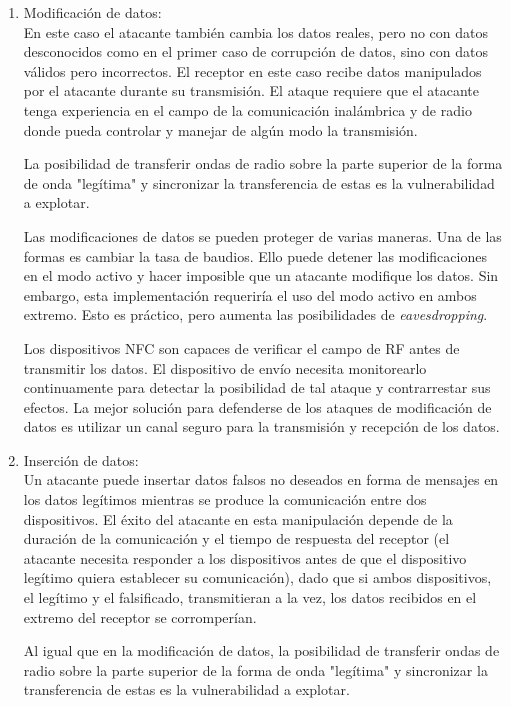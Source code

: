 \documentclass[12pt,a4paper,onecolumn,oneside]{report}
\begin{document}
\begin{enumerate}
\begin{enumerate}
\item Modificación de datos:\\
En este caso el atacante también cambia los datos reales, pero no con datos desconocidos como en el primer caso de corrupción de datos, sino con datos válidos pero incorrectos. El receptor en este caso recibe datos manipulados por el atacante durante su transmisión. El ataque requiere que el atacante tenga experiencia en el campo de la comunicación inalámbrica y de radio donde pueda controlar y manejar de algún modo la transmisión.

La posibilidad de transferir ondas de radio sobre la parte superior de la forma de onda "legítima" y sincronizar la transferencia de estas es la vulnerabilidad a explotar.

Las modificaciones de datos se pueden proteger de varias maneras. Una de las formas es cambiar la tasa de baudios. Ello puede detener las modificaciones en el modo activo y hacer imposible que un atacante modifique los datos. Sin embargo, esta implementación requeriría el uso del modo activo en ambos extremo. Esto es práctico, pero aumenta las posibilidades de \textit{eavesdropping}.

Los dispositivos NFC son capaces de verificar el campo de RF antes de transmitir los datos. El dispositivo de envío necesita monitorearlo continuamente para detectar la posibilidad de tal ataque y contrarrestar sus efectos. La mejor solución para defenderse de los ataques de modificación de datos es utilizar un canal seguro para la transmisión y recepción de los datos.

\item Inserción de datos:\\
Un atacante puede insertar datos falsos no deseados en forma de mensajes en los datos legítimos mientras se produce la comunicación entre dos dispositivos. El éxito del atacante en esta manipulación depende de la duración de la comunicación y el tiempo de respuesta del receptor (el atacante necesita responder a los dispositivos antes de que el dispositivo legítimo quiera establecer su comunicación), dado que si ambos dispositivos, el legítimo y el falsificado, transmitieran a la vez, los datos recibidos en el extremo del receptor se corromperían. 

Al igual que en la modificación de datos, la posibilidad de transferir ondas de radio sobre la parte superior de la forma de onda "legítima" y sincronizar la transferencia de estas es la vulnerabilidad a explotar.


\end{enumerate}
\end{enumerate}
\end{document}
